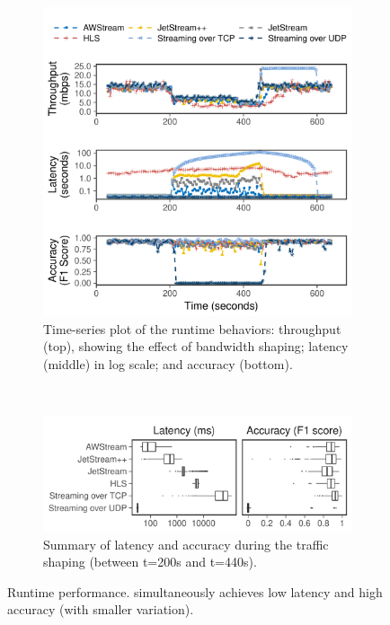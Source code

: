 \begin{figure}[t]
  \begin{subfigure}[t]{\columnwidth}
    \centering
    \includegraphics[width=\columnwidth]{figures/runtime_darknet-timeseries.pdf}
    \caption{Time-series plot of the runtime behaviors: throughput (top),
      showing the effect of bandwidth shaping; latency (middle) in log scale;
      and accuracy (bottom).}
    \label{fig:ar-runtime-timeseries}
  \end{subfigure}
  \vspace{1em}
  \\
  \begin{subfigure}[t]{\columnwidth}
    \centering
    \includegraphics[width=\columnwidth]{figures/runtime_darknet-boxplot.pdf}
    \caption{Summary of latency and accuracy during the traffic shaping (between
      t=200s and t=440s).}
    \label{fig:ar-runtime-boxplot}
  \end{subfigure}
  \caption{Runtime performance. \sysname{} simultaneously achieves low latency
    and high accuracy (with smaller variation).}
  \label{fig:ar-runtime}
\end{figure}

